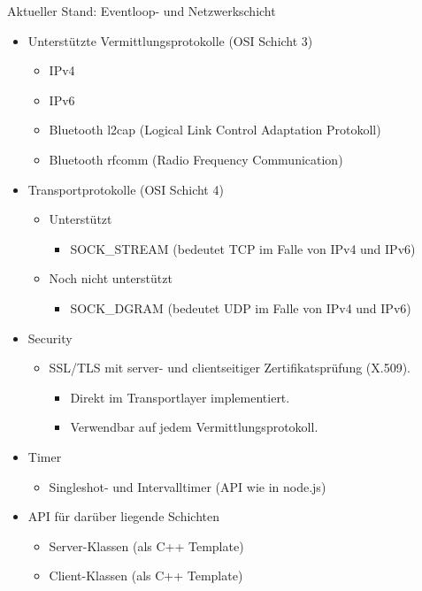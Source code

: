 \begin{frame}{Aktueller Stand: Eventloop- und Netzwerkschicht}
  \begin{itemize}
    \item \alert{Unterst\"utzte Vermittlungsprotokolle} (OSI Schicht 3)
    \begin{itemize}
      \item IPv4
      \item IPv6
      \item Bluetooth l2cap (Logical Link Control Adaptation Protokoll)
      \item Bluetooth rfcomm (Radio Frequency Communication)
    \end{itemize}
    \item \alert{Transportprotokolle} (OSI Schicht 4)
    \begin{itemize}
      \item \alert{Unterst\"utzt}
      \begin{itemize}
        \item \alert{SOCK\_STREAM} (bedeutet TCP im Falle von IPv4 und IPv6)
      \end{itemize}
      \item \alert{Noch nicht unterst\"utzt}
      \begin{itemize}
        \item \alert{SOCK\_DGRAM} (bedeutet UDP im Falle von IPv4 und IPv6)
      \end{itemize}
    \end{itemize}
    \item \alert{Security}
    \begin{itemize}
      \item \alert{SSL/TLS} mit server- und clientseitiger Zertifikatspr\"ufung (X.509).
      \begin{itemize}
        \item Direkt im Transportlayer implementiert.
        \item Verwendbar auf jedem Vermittlungsprotokoll.
      \end{itemize}
    \end{itemize}
    \item \alert{Timer}
    \begin{itemize}
      \item Singleshot- und Intervalltimer (API wie in node.js)
    \end{itemize}
    \item {\alert{API} für darüber liegende Schichten}
    \begin{itemize}
      \item \alert{Server}-Klassen (als C++ Template)
      \item \alert{Client}-Klassen (als C++ Template)
    \end{itemize}
  \end{itemize}
\end{frame}
